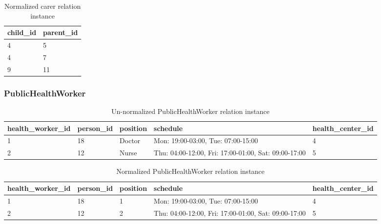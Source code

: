 \begin{table}[H]
\centering
\begin{adjustbox}{width=0.2\textwidth,center=\textwidth}
\begin{tabular}{|l|l|} 
        \hline
        child\_id & parent\_id \\ 
        \hline
        4 & 5 \\
        4 & 7 \\
        9 & 11 \\
        \hline
\end{tabular}
\end{adjustbox}
\caption{Normalized carer relation instance}
\end{table}

\newpage
\subsubsection{PublicHealthWorker}
\begin{table}[ht]
\centering
\begin{adjustbox}{width=1\textwidth,center=\textwidth}
\begin{tabular}{|l|l|l|l|l|} 
        \hline
        health\_worker\_id & person\_id & position & schedule & health\_center\_id\\ 
        \hline
        1 & 18 & Doctor & Mon: 19:00-03:00, Tue: 07:00-15:00 & 4\\
        2 & 12 & Nurse & Thu: 04:00-12:00, Fri: 17:00-01:00, Sat: 09:00-17:00 & 5\\
        \hline
\end{tabular}
\end{adjustbox}
\caption{Un-normalized PublicHealthWorker relation instance}
\end{table}

\begin{table}[ht]
\centering
\begin{adjustbox}{width=1\textwidth,center=\textwidth}
\begin{tabular}{|l|l|l|l|l|} 
        \hline
        health\_worker\_id & person\_id & position & schedule & health\_center\_id\\ 
        \hline
        1 & 18 & 1 & Mon: 19:00-03:00, Tue: 07:00-15:00 & 4\\
        2 & 12 & 2 & Thu: 04:00-12:00, Fri: 17:00-01:00, Sat: 09:00-17:00 & 5\\
        \hline
\end{tabular}
\end{adjustbox}
\caption{Normalized PublicHealthWorker relation instance}
\end{table}

